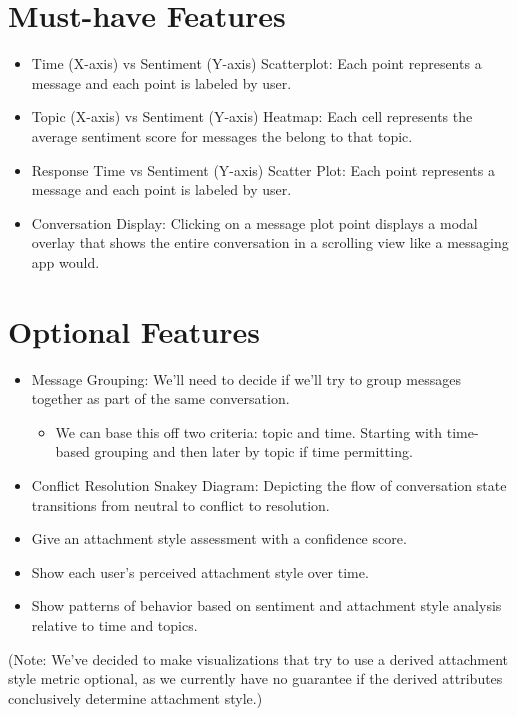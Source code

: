 \documentclass{article}\usepackage{graphicx}
\begin{document}
\section*{Must-have Features}
\begin{itemize}
    \item Time (X-axis) vs Sentiment (Y-axis) Scatterplot: Each point represents a message and each point is labeled by user. 
    \item Topic (X-axis) vs Sentiment (Y-axis) Heatmap: Each cell represents the average sentiment score for messages the belong to that topic. 
    \item Response Time vs Sentiment (Y-axis) Scatter Plot: Each point represents a message and each point is labeled by user. 
    \item Conversation Display: Clicking on a message plot point displays a modal overlay that shows the entire conversation in a scrolling view like a messaging app would.
\end{itemize}

\section*{Optional Features}
\begin{itemize}
    \item Message Grouping: We’ll need to decide if we’ll try to group messages together as part of the same conversation.
        \begin{itemize}
            \item We can base this off two criteria: topic and time. Starting with time-based grouping and then later by topic if time permitting.
        \end{itemize}
    \item Conflict Resolution Snakey Diagram: Depicting the flow of conversation state transitions from neutral to conflict to resolution.
    \item Give an attachment style assessment with a confidence score.
    \item Show each user's perceived attachment style over time.
    \item Show patterns of behavior based on sentiment and attachment style analysis relative to time and topics.
\end{itemize}
(Note: We’ve decided to make visualizations that try to use a derived attachment style metric optional, as we currently have no guarantee if the derived attributes conclusively determine attachment style.)
\end{document}
